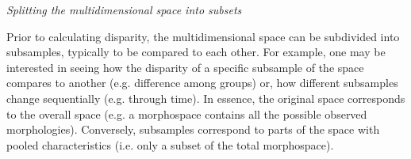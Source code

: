 \documentclass[12pt,letterpaper]{article}
\renewcommand{\subsection}[1]{%
\bigskip
\begin{center}
\begin{large}
\normalfont\itshape #1
\end{large}
\end{center}}
\begin{document}

\subsection{Splitting the multidimensional space into subsets}
Prior to calculating disparity, the multidimensional space can be subdivided into subsamples, typically to be compared to each other.
For example, one may be interested in seeing how the disparity of a specific subsample of the space compares to another (e.g. difference among groups) or, how different subsamples change sequentially (e.g. through time).
In essence, the original space corresponds to the overall space (e.g. a morphospace contains all the possible observed morphologies).
Conversely, subsamples correspond to parts of the space with pooled characteristics (i.e. only a subset of the total morphospace).
\end{document}
